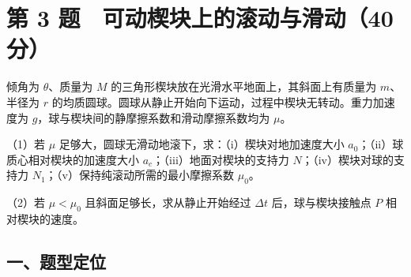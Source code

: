 \documentclass[12pt,a4paper,fontset=fandol]{ctexart}
\begin{document}
\clearpage

\section{第 3
题　可动楔块上的滚动与滑动（40分）}\label{ux7b2c-3-ux9898-ux53efux52a8ux6954ux5757ux4e0aux7684ux6edaux52a8ux4e0eux6ed1ux52a840ux5206}

倾角为 \(\theta\)、质量为 \(M\)
的三角形楔块放在光滑水平地面上，其斜面上有质量为 \(m\)、半径为 \(r\)
的均质圆球。圆球从静止开始向下运动，过程中楔块无转动。重力加速度为
\(g\)，球与楔块间的静摩擦系数和滑动摩擦系数均为 \(\mu\)。

\begin{center}
\begin{minipage}{\linewidth}
\centering\begingroup{}
\ifdim\wd\diagrambox>.88\linewidth
\sbox{\diagrambox}{\resizebox{.88\linewidth}{!}{\usebox{\diagrambox}}}\fi
\ifdim\ht\diagrambox>.38\textheight
\resizebox{!}{.38\textheight}{\usebox{\diagrambox}}
\else\usebox{\diagrambox}\fi
\par{}\endgroup\end{minipage}\end{center}

（1）若 \(\mu\) 足够大，圆球无滑动地滚下，求：（i）楔块对地加速度大小
\(a_0\)；（ii）球质心相对楔块的加速度大小
\(a_c\)；（iii）地面对楔块的支持力 \(N\)；（iv）楔块对球的支持力
\(N_1\)；（v）保持纯滚动所需的最小摩擦系数 \(\mu_0\)。

（2）若 \(\mu<\mu_0\) 且斜面足够长，求从静止开始经过 \(\Delta t\)
后，球与楔块接触点 \(P\) 相对楔块的速度。

\subsection{一、题型定位}\label{ux4e00ux9898ux578bux5b9aux4f4d-2}
\end{document}
